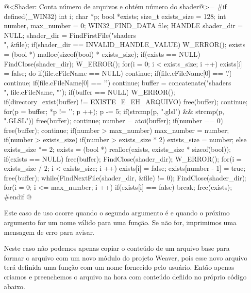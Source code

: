 {\iniciocodigo
@<Shader: Conta número de arquivos e obtém número do shader@>=
#if defined(_WIN32)
{
  int i;
  char *p;
  bool *exists;
  size_t exists_size = 128;
  int number, max_number = 0;
  WIN32_FIND_DATA file;
  HANDLE shader_dir = NULL;
  shader_dir = FindFirstFile("shaders\\", &file);
  if(shader_dir == INVALID_HANDLE_VALUE)
    W_ERROR();
  exists = (bool *) malloc(sizeof(bool) * exists_size);
  if(exists == NULL){
    FindClose(shader_dir);
    W_ERROR();
  }
  for(i = 0; i < exists_size; i ++)
    exists[i] = false;
  do{
    if(file.cFileName == NULL) continue;
    if(file.cFileName[0] == '.') continue;
    if(file.cFileName[0] == '\0') continue;
    buffer = concatenate("shaders\\", file.cFileName, "");
    if(buffer == NULL) W_ERROR();
    if(directory_exist(buffer) != EXISTE_E_EH_ARQUIVO){
      free(buffer);
      continue;
    }
    for(p = buffer; *p != '\0'; p ++);
    p -= 5;
    if(strcmp(p, ".glsl") && strcmp(p, ".GLSL")){
      free(buffer);
      continue;
    }
    number = atoi(buffer);
    if(number == 0){
      free(buffer);
      continue;
    }
    if(number > max_number)
      max_number = number;
    if(number > exists_size){
      if(number > exists_size * 2)
        exists_size = number;
      else
        exists_size *= 2;
      exists = (bool *) realloc(exists, exists_size * sizeof(bool));
      if(exists == NULL){
        free(buffer);
        FindClose(shader_dir);
        W_ERROR();
      }
      for(i = exists_size / 2; i < exists_size; i ++)
        exists[i] = false;
    }
    exists[number - 1] = true;
    free(buffer);
  }while(FindNextFile(shader_dir, &file) != 0);
  FindClose(shader_dir);
  for(i = 0; i <= max_number; i ++)
  if(exists[i] == false){
    break;
  }
  free(exists);
}
#endif
@
\fimcodigo


Este caso de uso ocorre quando o segundo argumento é
 e quando o próximo argumento for um nome válido
para uma função. Se não for, imprimimos uma mensagem de erro para
avisar.

Neste caso não podemos apenas copiar o conteúdo de um arquivo base
para formar o arquivo com um novo módulo do projeto Weaver, pois esse
novo arquivo terá definida uma função com um nome fornecido pelo
usuário. Então apenas criamos e preenchemos o arquivo na hora com
conteúdo defiido no próprio código abaixo.

}
